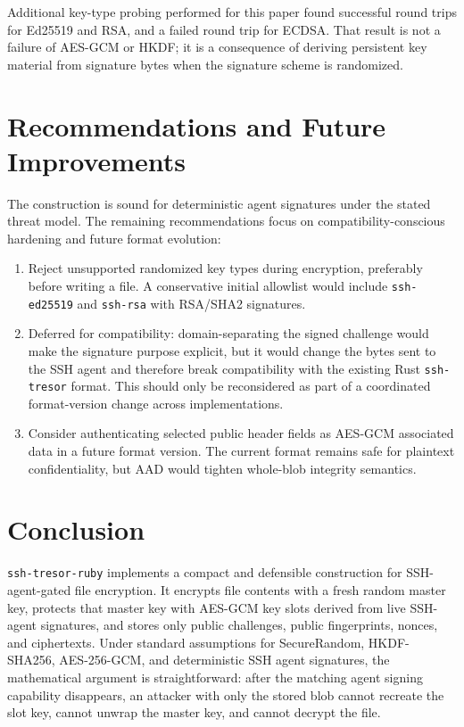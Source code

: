 \documentclass[11pt]{article}
\theoremstyle{definition}
\theoremstyle{plain}
\newcommand{\Project}{\texttt{ssh-tresor-ruby}}
\begin{document}
Additional key-type probing performed for this paper found successful round trips for Ed25519 and RSA, and a failed round trip for ECDSA. That result is not a failure of AES-GCM or HKDF; it is a consequence of deriving persistent key material from signature bytes when the signature scheme is randomized.

\section{Recommendations and Future Improvements}

The construction is sound for deterministic agent signatures under the stated threat model. The remaining recommendations focus on compatibility-conscious hardening and future format evolution:

\begin{enumerate}[leftmargin=*]
  \item Reject unsupported randomized key types during encryption, preferably before writing a file. A conservative initial allowlist would include \texttt{ssh-ed25519} and \texttt{ssh-rsa} with RSA/SHA2 signatures.
  \item Deferred for compatibility: domain-separating the signed challenge would make the signature purpose explicit, but it would change the bytes sent to the SSH agent and therefore break compatibility with the existing Rust \texttt{ssh-tresor} format. This should only be reconsidered as part of a coordinated format-version change across implementations.
  \item Consider authenticating selected public header fields as AES-GCM associated data in a future format version. The current format remains safe for plaintext confidentiality, but AAD would tighten whole-blob integrity semantics.
\end{enumerate}

\section{Conclusion}

\Project{} implements a compact and defensible construction for SSH-agent-gated file encryption. It encrypts file contents with a fresh random master key, protects that master key with AES-GCM key slots derived from live SSH-agent signatures, and stores only public challenges, public fingerprints, nonces, and ciphertexts. Under standard assumptions for SecureRandom, HKDF-SHA256, AES-256-GCM, and deterministic SSH agent signatures, the mathematical argument is straightforward: after the matching agent signing capability disappears, an attacker with only the stored blob cannot recreate the slot key, cannot unwrap the master key, and cannot decrypt the file.
\end{document}
